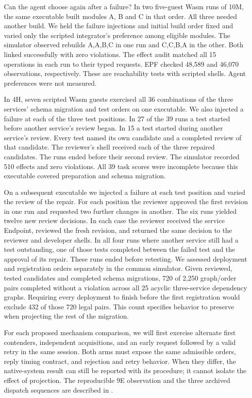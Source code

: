 \documentclass[10pt]{article}
\begin{document}
Can the agent choose again after a failure? In two five-guest Wasm runs of
10M, the same executable built modules A, B and C in that order. All three
needed another build. We held the failure injections and initial build order
fixed and varied only the scripted integrator's preference among eligible
modules. The simulator observed rebuilds A,A,B,C in one run and C,C,B,A in
the other. Both linked successfully with zero violations. The effect audit
matched all 15 operations in each run to their typed requests. EPF checked
48,589 and 46,070 observations, respectively. These are reachability tests
with scripted shells. Agent preferences were not measured.

In 4H, seven scripted Wasm guests exercised all 36 combinations of the three
services' schema migration and test orders on one executable. We also
injected a failure at each of the three test positions. In 27 of the 39
runs a test started before another service's review began. In 15 a test
started during another service's review. Every test named its own candidate
and a completed review of that candidate. The reviewer's shell received each
of the three repaired candidates. The runs ended before their second review.
The simulator recorded 510 effects and zero violations. All 39 task scores were incomplete because this
executable covered preparation and schema migration.

On a subsequent executable we injected a failure at each test position and
varied the review of the repair. For each position the reviewer approved the
first revision in one run and requested two further changes in another.
The six runs yielded twelve new review decisions. In each case the
reviewer received the service Endpoint, reviewed the fresh revision, and
returned the same decision to the reviewer and developer shells. In all
four runs where another service still had a test outstanding, one of those
tests completed between the failed test and the approval of its repair.
These runs ended before retesting. We assessed deployment and registration
orders separately in the common simulator. Given reviewed, tested candidates
and completed schema migrations, 720 of 2,250 graph/order pairs completed
without a violation across all 25 acyclic three-service dependency graphs.
Requiring every deployment to finish before the first registration would
exclude 432 of those 720 legal pairs. This count specifies behavior to
preserve when projecting the rest of the migration.

For each proposed mechanism comparison, we will first exercise alternate first
contenders, independent acquisitions, and an early request followed by a valid
retry in the same session. Both arms must expose the same admissible orders,
reply timing contract, and rejection and retry behavior. When they differ,
the native-system result can still be reported with its procedure; it cannot
isolate the effect of projection. The reproducible 9E observation and the
three archived dispatch sequences are described in .
\end{document}
